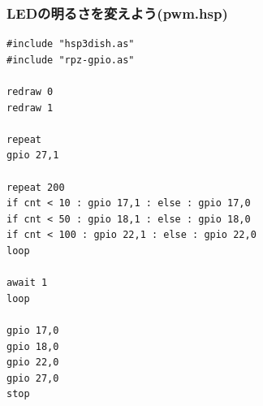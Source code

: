 \begin{frame}[fragile]
    \frametitle{LEDの明るさを変えよう(pwm.hsp)}
\begin{lstlisting}
#include "hsp3dish.as"
#include "rpz-gpio.as"

redraw 0
redraw 1

repeat
gpio 27,1

repeat 200
if cnt < 10 : gpio 17,1 : else : gpio 17,0
if cnt < 50 : gpio 18,1 : else : gpio 18,0
if cnt < 100 : gpio 22,1 : else : gpio 22,0
loop

await 1
loop

gpio 17,0
gpio 18,0
gpio 22,0
gpio 27,0
stop
\end{lstlisting}
\end{frame}

